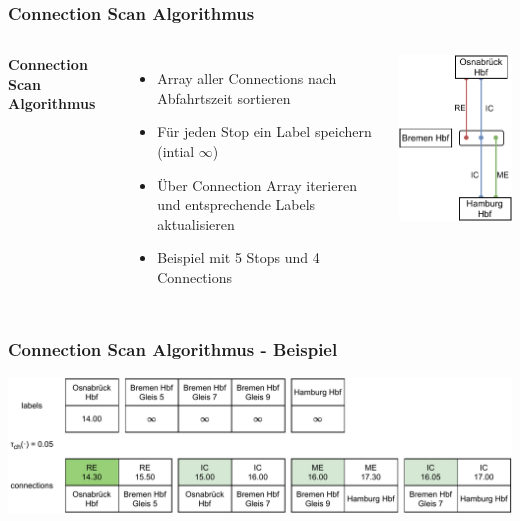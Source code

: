 \documentclass[aspectratio=169]{beamer}
\begin{document}


\begin{frame}
\frametitle{Connection Scan Algorithmus}
\begin{columns}[c] %
	
	\textbf{Connection Scan Algorithmus}
	\begin{itemize}
		\item Array aller Connections nach Abfahrtszeit sortieren
		\item Für jeden Stop ein Label speichern (intial $\infty$)
		\item Über Connection Array iterieren und entsprechende Labels aktualisieren
		\item Beispiel mit 5 Stops und 4 Connections
	\end{itemize}
	\includegraphics[scale=1]{csa_instance.pdf}
	
\end{columns}
\end{frame}


\begin{frame}
\frametitle{Connection Scan Algorithmus - Beispiel}
\centering
\includegraphics[scale=.7]{csa0.pdf}
\end{frame}
\end{document}
